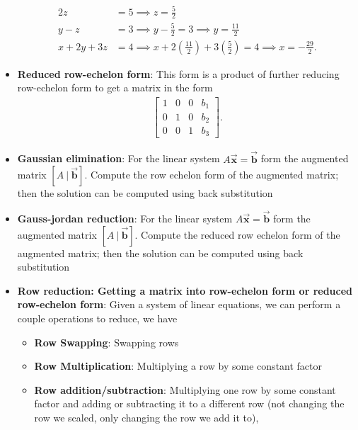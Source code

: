 \documentclass{report}
\begin{document}
\begin{itemize}
                \begin{align*}
                    2z &= 5 \implies z = \frac{5}{2}         \\
                    y - z &= 3 \implies y - \frac{5}{2} = 3 \implies y = \frac{11}{2} \\
                    x + 2y + 3z &= 4 \implies x + 2\left(\frac{11}{2}\right)  + 3 \left(\frac{5}{2}\right) = 4 \implies x = -\frac{29}{2}
                .\end{align*}
            \item \textbf{Reduced row-echelon form}: This form is a product of further reducing row-echelon form to get a matrix in the form
                \begin{align*}
                    \left[
                        \begin{array}{ccc|c}
                            1 & 0 & 0 & b_{1} \\
                            0 & 1 & 0 & b_{2} \\
                            0 & 0 & 1 & b_{3}
                        \end{array}
                    \right]
                .\end{align*}
            \item \textbf{Gaussian elimination}:  For the linear system $A\vec{\mathbf{x}} = \vec{\mathbf{b}}$ form the augmented matrix $[A\ |\ \vec{\mathbf{b}}]$. Compute the row echelon form of the augmented matrix; then the solution can be computed using back substitution
            \item \textbf{Gauss-jordan reduction}:  For the linear system $A\vec{\mathbf{x}} = \vec{\mathbf{b}}$ form the augmented matrix $[A\ |\ \vec{\mathbf{b}}]$. Compute the reduced row echelon form of the augmented matrix; then the solution can be computed using back substitution
            \item \textbf{Row reduction: Getting a matrix into row-echelon form or reduced row-echelon form}: Given a system of linear equations, we can perform a couple operations to reduce, we have
                \begin{itemize}
                    \item \textbf{Row Swapping}: Swapping rows
                    \item \textbf{Row Multiplication}: Multiplying a row by some constant factor
                    \item \textbf{Row addition/subtraction}: Multiplying one row by some constant factor and adding or subtracting it to a different row (not changing the row we scaled, only changing the row we add it to),

\end{itemize}
\end{itemize}
\end{document}
